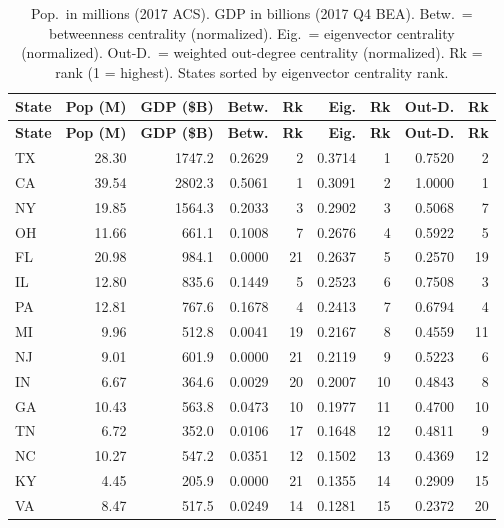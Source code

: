 \documentclass[12pt,oneside]{book}
\begin{document}
\begin{footnotesize}
\begin{singlespace}
\begin{longtable}{l r r r r r r r r}
\caption[Complete centrality data for all 51 domestic nodes sorted by eigenvector centrality rank.]{Pop.\ in millions (2017 ACS). GDP in billions (2017 Q4 BEA). Betw.\ = betweenness centrality (normalized). Eig.\ = eigenvector centrality (normalized). Out-D.\ = weighted out-degree centrality (normalized). Rk = rank (1 = highest). States sorted by eigenvector centrality rank.} \label{tab:node_distribution} \\

\hline
\textbf{State} & \textbf{Pop (M)} & \textbf{GDP (\$B)} & \textbf{Betw.} & \textbf{Rk} & \textbf{Eig.} & \textbf{Rk} & \textbf{Out-D.} & \textbf{Rk} \\
\hline
\endfirsthead
\hline
\textbf{State} & \textbf{Pop (M)} & \textbf{GDP (\$B)} & \textbf{Betw.} & \textbf{Rk} & \textbf{Eig.} & \textbf{Rk} & \textbf{Out-D.} & \textbf{Rk} \\
\hline
\endhead
\hline
\endfoot
TX & 28.30 & 1747.2 & 0.2629 & 2 & 0.3714 & 1 & 0.7520 & 2 \\
CA & 39.54 & 2802.3 & 0.5061 & 1 & 0.3091 & 2 & 1.0000 & 1 \\
NY & 19.85 & 1564.3 & 0.2033 & 3 & 0.2902 & 3 & 0.5068 & 7 \\
OH & 11.66 & 661.1 & 0.1008 & 7 & 0.2676 & 4 & 0.5922 & 5 \\
FL & 20.98 & 984.1 & 0.0000 & 21 & 0.2637 & 5 & 0.2570 & 19 \\
IL & 12.80 & 835.6 & 0.1449 & 5 & 0.2523 & 6 & 0.7508 & 3 \\
PA & 12.81 & 767.6 & 0.1678 & 4 & 0.2413 & 7 & 0.6794 & 4 \\
MI & 9.96 & 512.8 & 0.0041 & 19 & 0.2167 & 8 & 0.4559 & 11 \\
NJ & 9.01 & 601.9 & 0.0000 & 21 & 0.2119 & 9 & 0.5223 & 6 \\
IN & 6.67 & 364.6 & 0.0029 & 20 & 0.2007 & 10 & 0.4843 & 8 \\
GA & 10.43 & 563.8 & 0.0473 & 10 & 0.1977 & 11 & 0.4700 & 10 \\
TN & 6.72 & 352.0 & 0.0106 & 17 & 0.1648 & 12 & 0.4811 & 9 \\
NC & 10.27 & 547.2 & 0.0351 & 12 & 0.1502 & 13 & 0.4369 & 12 \\
KY & 4.45 & 205.9 & 0.0000 & 21 & 0.1355 & 14 & 0.2909 & 15 \\
VA & 8.47 & 517.5 & 0.0249 & 14 & 0.1281 & 15 & 0.2372 & 20 \\

\end{longtable}
\end{singlespace}
\end{footnotesize}
\end{document}
